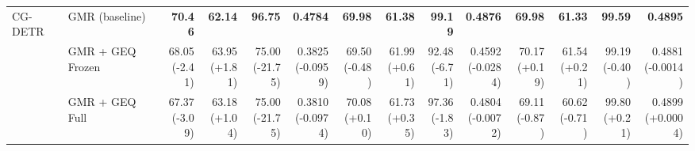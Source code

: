 \documentclass{article}
\begin{document}
{\begin{tabular}{llrrrrrrrrrrrr}
\midrule
CG-DETR & GMR (baseline) & \textbf{70.46} & \textbf{62.14} & \textbf{96.75} & \textbf{0.4784} & \textbf{69.98} & \textbf{61.38} & \textbf{99.19} & \textbf{0.4876} & \textbf{69.98} & \textbf{61.33} & \textbf{99.59} & \textbf{0.4895} \\
 & GMR + GEQ Frozen & \shortstack{68.05 \\ {\scriptsize\textcolor{Loss}{(-2.41)}}} & \shortstack{63.95 \\ {\scriptsize\textcolor{Gain}{(+1.81)}}} & \shortstack{75.00 \\ {\scriptsize\textcolor{Loss}{(-21.75)}}} & \shortstack{0.3825 \\ {\scriptsize\textcolor{Loss}{(-0.0959)}}} & \shortstack{69.50 \\ {\scriptsize\textcolor{Loss}{(-0.48)}}} & \shortstack{61.99 \\ {\scriptsize\textcolor{Gain}{(+0.61)}}} & \shortstack{92.48 \\ {\scriptsize\textcolor{Loss}{(-6.71)}}} & \shortstack{0.4592 \\ {\scriptsize\textcolor{Loss}{(-0.0284)}}} & \shortstack{70.17 \\ {\scriptsize\textcolor{Gain}{(+0.19)}}} & \shortstack{61.54 \\ {\scriptsize\textcolor{Gain}{(+0.21)}}} & \shortstack{99.19 \\ {\scriptsize\textcolor{Loss}{(-0.40)}}} & \shortstack{0.4881 \\ {\scriptsize\textcolor{Loss}{(-0.0014)}}} \\
 & GMR + GEQ Full & \shortstack{67.37 \\ {\scriptsize\textcolor{Loss}{(-3.09)}}} & \shortstack{63.18 \\ {\scriptsize\textcolor{Gain}{(+1.04)}}} & \shortstack{75.00 \\ {\scriptsize\textcolor{Loss}{(-21.75)}}} & \shortstack{0.3810 \\ {\scriptsize\textcolor{Loss}{(-0.0974)}}} & \shortstack{70.08 \\ {\scriptsize\textcolor{Gain}{(+0.10)}}} & \shortstack{61.73 \\ {\scriptsize\textcolor{Gain}{(+0.35)}}} & \shortstack{97.36 \\ {\scriptsize\textcolor{Loss}{(-1.83)}}} & \shortstack{0.4804 \\ {\scriptsize\textcolor{Loss}{(-0.0072)}}} & \shortstack{69.11 \\ {\scriptsize\textcolor{Loss}{(-0.87)}}} & \shortstack{60.62 \\ {\scriptsize\textcolor{Loss}{(-0.71)}}} & \shortstack{99.80 \\ {\scriptsize\textcolor{Gain}{(+0.21)}}} & \shortstack{0.4899 \\ {\scriptsize\textcolor{Gain}{(+0.0004)}}} \\

\end{tabular}}
\end{document}
